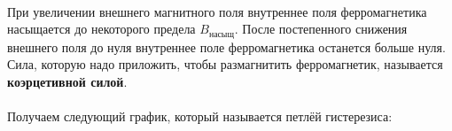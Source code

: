\documentclass[dvipdfmx]{article}
\begin{document}
\paragraph{}

При увеличении внешнего магнитного поля внутреннее поля ферромагнетика насыщается до некоторого
предела $B_{\text{насыщ}}$.
После постепенного снижения внешнего поля до нуля внутреннее поле ферромагнетика останется больше нуля.
Сила, которую надо приложить, чтобы размагнитить ферромагнетик, называется \textbf{коэрцетивной силой}.

\paragraph{}

Получаем следующий график, который называется петлёй гистерезиса:

\paragraph{}
\noindent{}
\paragraph{}
\end{document}
